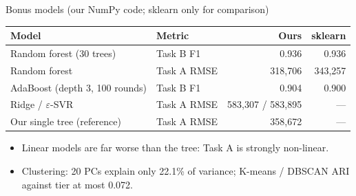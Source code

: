 \documentclass[aspectratio=169,11pt]{beamer}
\begin{document}
\begin{frame}{Bonus models (our NumPy code; sklearn only for comparison)}
  \small
  \begin{tabular}{@{}llrr@{}}
    \toprule
    Model & Metric & Ours & sklearn \\
    \midrule
    Random forest (30 trees) & Task B F1 & 0.936 & 0.936 \\
    Random forest & Task A RMSE & 318,706 & 343,257 \\
    AdaBoost (depth 3, 100 rounds) & Task B F1 & 0.904 & 0.900 \\
    Ridge / $\varepsilon$-SVR & Task A RMSE & 583,307 / 583,895 & --- \\
    Our single tree (reference) & Task A RMSE & 358,672 & --- \\
    \bottomrule
  \end{tabular}
  \vspace{0.6em}
  \begin{itemize}
    \item Linear models are far worse than the tree: Task A is strongly non-linear.
    \item Clustering: 20 PCs explain only 22.1\% of variance; K-means / DBSCAN ARI against tier at most 0.072.
  \end{itemize}
\end{frame}
\end{document}
